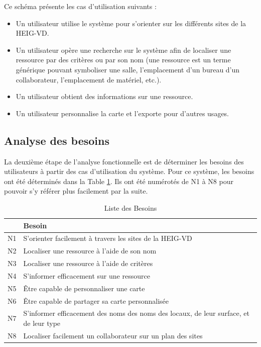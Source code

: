 \documentclass[
    iai, %
    il, %
]{heig-tb}
\begin{document}
Ce schéma présente les cas d'utilisation suivants :
\begin{itemize}
    \item Un utilisateur utilise le système pour s'orienter sur les différents sites de la HEIG-VD.
    \item Un utilisateur opère une recherche sur le système afin de localiser une ressource par des critères ou par son nom (une ressource est un terme générique pouvant symboliser une salle, l'emplacement d'un bureau d'un collaborateur, l'emplacement de matériel, etc.).
    \item Un utilisateur obtient des informations sur une ressource.
    \item Un utilisateur personnalise la carte et l'exporte pour d'autres usages.
\end{itemize}

\subsection{Analyse des besoins}
La deuxième étape de l'analyse fonctionnelle est de déterminer les besoins des utilisateurs à partir des cas d'utilisation du système.
Pour ce système, les besoins ont été déterminés dans la Table \ref{besoins}. Ils ont été numérotés de N1 à N8 pour pouvoir s'y référer plus facilement par la suite.
\begin{table}[h]
    \begin{center}
        \begin{tabular}{l|l}
               & Besoin                                                                                 \\ \hline
            N1 & S'orienter facilement à travers les sites de la HEIG-VD                                \\
            N2 & Localiser une ressource à l'aide de son nom                                            \\
            N3 & Localiser une ressource à l'aide de critères                                           \\
            N4 & S'informer efficacement sur une ressource                                              \\
            N5 & Être capable de personnaliser une carte                                                \\
            N6 & Être capable de partager sa carte personnalisée                                        \\
            N7 & S'informer efficacement des noms des noms des locaux, de leur surface, et de leur type \\
            N8 & Localiser facilement un collaborateur sur un plan des sites
        \end{tabular}
        \caption{Liste des Besoins \label{besoins}}
    \end{center}
\end{table}
\end{document}
